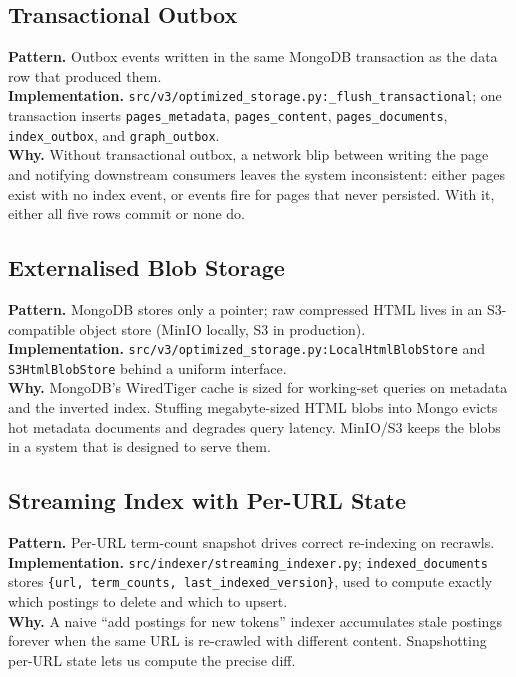 \documentclass[11pt,a4paper]{article}
\newcommand{\code}[1]{\texttt{#1}}
\begin{document}
\subsection{Transactional Outbox}

\textbf{Pattern.} Outbox events written in the same MongoDB transaction as the data row that produced them.\\
\textbf{Implementation.} \code{src/v3/optimized\_storage.py:\_flush\_transactional}; one transaction inserts \code{pages\_metadata}, \code{pages\_content}, \code{pages\_documents}, \code{index\_outbox}, and \code{graph\_outbox}.\\
\textbf{Why.} Without transactional outbox, a network blip between writing the page and notifying downstream consumers leaves the system inconsistent: either pages exist with no index event, or events fire for pages that never persisted. With it, either all five rows commit or none do.

\subsection{Externalised Blob Storage}

\textbf{Pattern.} MongoDB stores only a pointer; raw compressed HTML lives in an S3-compatible object store (MinIO locally, S3 in production).\\
\textbf{Implementation.} \code{src/v3/optimized\_storage.py:LocalHtmlBlobStore} and \code{S3HtmlBlobStore} behind a uniform interface.\\
\textbf{Why.} MongoDB's WiredTiger cache is sized for working-set queries on metadata and the inverted index. Stuffing megabyte-sized HTML blobs into Mongo evicts hot metadata documents and degrades query latency. MinIO/S3 keeps the blobs in a system that is designed to serve them.

\subsection{Streaming Index with Per-URL State}

\textbf{Pattern.} Per-URL term-count snapshot drives correct re-indexing on recrawls.\\
\textbf{Implementation.} \code{src/indexer/streaming\_indexer.py}; \code{indexed\_documents} stores \code{\{url, term\_counts, last\_indexed\_version\}}, used to compute exactly which postings to delete and which to upsert.\\
\textbf{Why.} A naive ``add postings for new tokens'' indexer accumulates stale postings forever when the same URL is re-crawled with different content. Snapshotting per-URL state lets us compute the precise diff.
\end{document}
